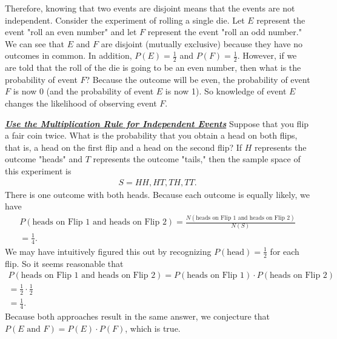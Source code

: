 \documentclass{report}
\begin{document}
    \bigbreak \noindent 
    Therefore, knowing that two events are disjoint means that the events are not independent.
    \bigbreak \noindent 
    Consider the experiment of rolling a single die. Let $E$ represent the event "roll an even number" and let $F$ represent the event "roll an odd number." We can see that $E$ and $F$ are disjoint (mutually exclusive) because they have no outcomes in common. In addition, $P(E)=\frac{1}{2}$ and $P(F)=\frac{1}{2}$. However, if we are told that the roll of the die is going to be an even number, then what is the probability of event $F$? Because the outcome will be even, the probability of event $F$ is now 0 (and the probability of event $E$ is now 1). So knowledge of event $E$ changes the likelihood of observing event $F$.

    \bigbreak \noindent \bigbreak \noindent 
    \textbf{\textit{\underline{Use the Multiplication Rule for Independent Events}}}
    \bigbreak \noindent 
    Suppose that you flip a fair coin twice. What is the probability that you obtain a head on both flips, that is, a head on the first flip and a head on the second flip? If $H$ represents the outcome "heads" and $T$ represents the outcome "tails," then the sample space of this experiment is
    \begin{align*}
        S={HH,HT,TH,TT}
    .\end{align*}
    \bigbreak \noindent 
    There is one outcome with both heads. Because each outcome is equally likely, we have
    \begin{align*}
        P(\text{heads on Flip 1 and heads on Flip 2})=\frac{N(\text{heads on Flip 1 and heads on Flip 2})}{N(S)} \\ =\frac{1}{4}
    .\end{align*}
    \bigbreak \noindent 
    We may have intuitively figured this out by recognizing $P(\text{head})=\frac{1}{2}$ for each flip. So it seems reasonable that
    \begin{align*}
        P(\text{heads on Flip 1 and heads on Flip 2})=P(\text{heads on Flip 1})\cdot P(\text{heads on Flip 2})\\ =\frac{1}{2}\cdot\frac{1}{2}\\ =\frac{1}{4}
    .\end{align*}
    \bigbreak \noindent 
    Because both approaches result in the same answer, we conjecture that $P(E \text{ and } F)=P(E)\cdot P(F)$, which is true.
    \pagebreak \bigbreak \noindent
\end{document}
